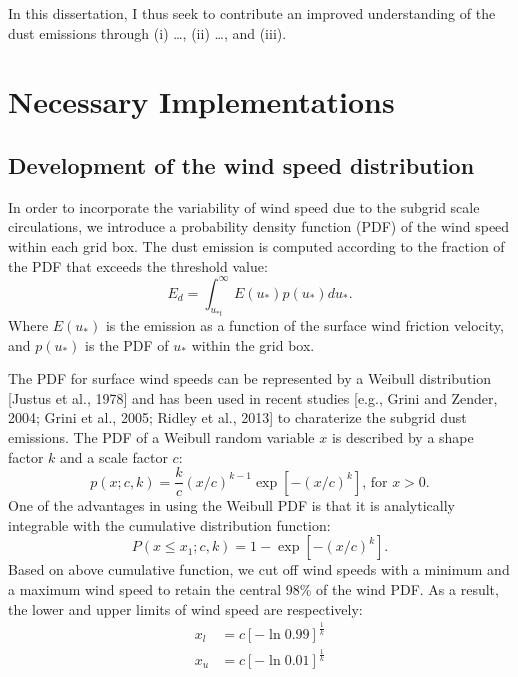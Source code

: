  In this dissertation, I thus seek to contribute an improved understanding
 of the dust emissions through (i) \ldots, (ii) \ldots, and (iii).

\section{Necessary Implementations}

\subsection{Development of the wind speed distribution}

  In order to incorporate the variability of wind speed due to the subgrid scale
  circulations, we introduce a probability density function (PDF) of the wind speed
  within each grid box. The dust emission is computed according to the fraction of
  the PDF that exceeds the threshold value:
  \begin{equation}
  E_{d} = \int^\infty_{u_{*t}} E(u_*) p(u_*) d u_* \mbox{.}
  \end{equation}
  Where $E(u_*)$ is the emission as a function of the surface wind friction velocity,
  and $p(u_*)$ is the PDF of $u_*$ within the grid box.

  The PDF for surface wind speeds can be represented by a Weibull distribution
  [Justus et al., 1978] and has been used in recent studies [e.g., Grini and Zender,
  2004; Grini et al., 2005; Ridley et al., 2013] to charaterize the subgrid dust
  emissions. The PDF of a Weibull random variable $x$ is described by a shape factor $k$
  and a scale factor $c$:
  \begin{equation}
  p(x;c,k) = \frac{k}{c} (x/c )^{k-1}
         \exp{\left[ -(x/c)^k \right]} \mbox{,  for } x>0 \mbox{.} 
  \end{equation}
  One of the advantages in using the Weibull PDF is that it is analytically
  integrable with the cumulative distribution function:
  \begin{equation}
  P(x \leq x_1;c,k) = 1 - \exp{ \left[ -(x/c)^k\right] } \mbox{.}
  \end{equation}
  Based on above cumulative function, we cut off wind speeds with a minimum and a
  maximum wind speed to retain the central 98\% of the wind PDF. As a result, the
  lower and upper limits of wind speed are respectively:
  \begin{align} 
  x_{l} &= c \left[ -\ln{0.99} \right]^{\frac{1}{k}}  \\
  x_{u} &= c \left[ -\ln{0.01} \right]^{\frac{1}{k}} \label{eq:xu}
  \end{align}


